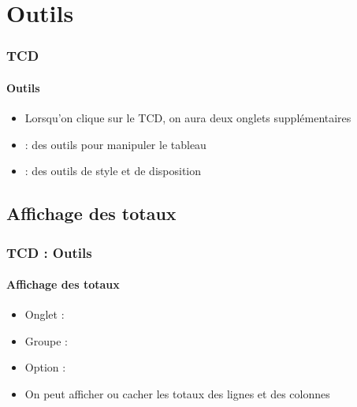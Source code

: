 \documentclass[xcolor=table, usenames,dvipsnames]{beamer}
\begin{document}
\section{Outils}

\begin{frame}
\frametitle{TCD}
\framesubtitle{Outils}

\begin{itemize}
	\item Lorsqu'on clique sur le TCD, on aura deux onglets supplémentaires 
	\item {} : des outils pour manipuler le tableau 
\end{itemize}


\begin{itemize}
	\item {} : des outils de style et de disposition
\end{itemize}




\end{frame}

\subsection{Affichage des totaux}

\begin{frame}
\frametitle{TCD : Outils}
\framesubtitle{Affichage des totaux}

\begin{minipage}{0.59\textwidth}
	\begin{itemize}
		\item Onglet : 
		\item Groupe : 
		\item Option : 
		\item On peut afficher ou cacher les totaux des lignes et des colonnes 
	\end{itemize}
\end{minipage}
%
\begin{minipage}{0.4\textwidth} 
\end{minipage}

\end{frame}
\end{document}
